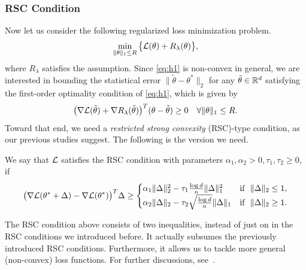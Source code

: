 \subsubsection{RSC Condition}

Now let us consider the following regularized loss minimization problem.
\begin{equation}\label{eq:h1}
    \min_{\|\theta\|_1\le R}\big\{\mathcal{L}(\theta)+R_\lambda(\theta)\big\},
\end{equation}
where $R_\lambda$ satisfies the assumption.
Since \eqref{eq:h1} is non-convex in general,
we are interested in bounding the statistical error $\|\tilde\theta-\theta^*\|_2$
for any $\tilde\theta\in{\mathbb{R}}^d$ satisfying the first-order optimality condition
of \eqref{eq:h1},
which is given by
\begin{equation}
    \big(\nabla\mathcal{L}(\tilde\theta)+\nabla R_\lambda(\tilde\theta)\big)^T(\theta-\tilde\theta)
        \ge0\quad\forall\|\theta\|_1\le R.
\end{equation}
Toward that end,
we need a \emph{restricted strong convexity} (RSC)-type condition,
as our previous studies suggest.
The following is the version we need.

\begin{define}
We say that $\mathcal{L}$ satisfies the RSC condition with parameters
$\alpha_1,\alpha_2>0,\tau_1,\tau_2\ge0$, if
\begin{equation}
    \big(\nabla\mathcal{L}(\theta^*+\Delta)-\nabla\mathcal{L}(\theta^*)\big)^T\Delta\ge
    \begin{cases}
        \alpha_1\|\Delta\|_2^2-\tau_1\frac{\log d}{n}\|\Delta\|_1^2 &\text{if }~\|\Delta\|_2\le1,\\
        \alpha_2\|\Delta\|_2-\tau_2\sqrt{\frac{\log d}{n}}\|\Delta\|_1 &\text{if }~\|\Delta\|_2\ge1.\\
    \end{cases}
\end{equation}
\end{define}

The RSC condition above consists of two inequalities,
instead of just on in the RSC conditions we introduced before.
It actually subsumes the previously introduced RSC conditions.
Furthermore,
it allows us to tackle more general (non-convex) loss functions.
For further discussions,
see~\cite{loh2015regularized}.

